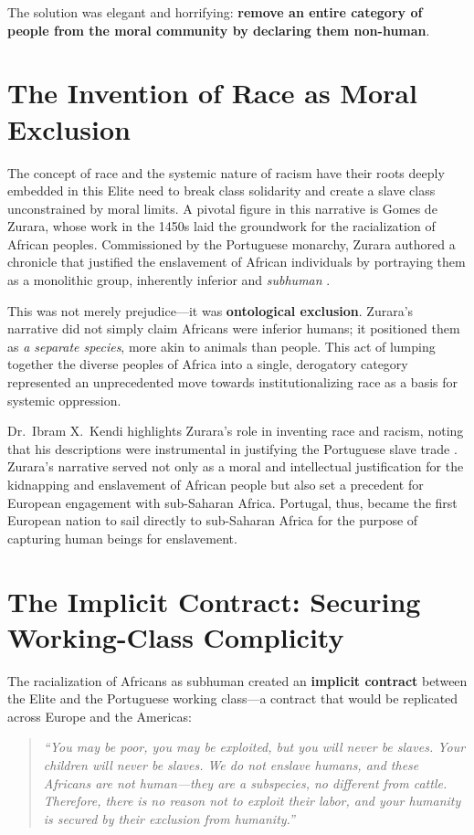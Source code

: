 \documentclass[12pt,openany]{book}
\begin{document}
The solution was elegant and horrifying: \textbf{remove an entire category of people from the moral community by declaring them non-human}.

\section{The Invention of Race as Moral Exclusion}

The concept of race and the systemic nature of racism have their roots deeply embedded in this Elite need to break class solidarity and create a slave class unconstrained by moral limits. A pivotal figure in this narrative is Gomes de Zurara, whose work in the 1450s laid the groundwork for the racialization of African peoples. Commissioned by the Portuguese monarchy, Zurara authored a chronicle that justified the enslavement of African individuals by portraying them as a monolithic group, inherently inferior and \textit{subhuman} \cite{zurara, kendi}. 

This was not merely prejudice---it was \textbf{ontological exclusion}. Zurara's narrative did not simply claim Africans were inferior humans; it positioned them as \textit{a separate species}, more akin to animals than people. This act of lumping together the diverse peoples of Africa into a single, derogatory category represented an unprecedented move towards institutionalizing race as a basis for systemic oppression.

Dr.\ Ibram X.\ Kendi highlights Zurara's role in inventing race and racism, noting that his descriptions were instrumental in justifying the Portuguese slave trade \cite{kendi}. Zurara's narrative served not only as a moral and intellectual justification for the kidnapping and enslavement of African people but also set a precedent for European engagement with sub-Saharan Africa. Portugal, thus, became the first European nation to sail directly to sub-Saharan Africa for the purpose of capturing human beings for enslavement.

\section{The Implicit Contract: Securing Working-Class Complicity}

The racialization of Africans as subhuman created an \textbf{implicit contract} between the Elite and the Portuguese working class---a contract that would be replicated across Europe and the Americas:

\begin{quote}
\textit{``You may be poor, you may be exploited, but you will never be slaves. Your children will never be slaves. We do not enslave humans, and these Africans are not human---they are a subspecies, no different from cattle. Therefore, there is no reason not to exploit their labor, and your humanity is secured by their exclusion from humanity.''}
\end{quote}
\end{document}
